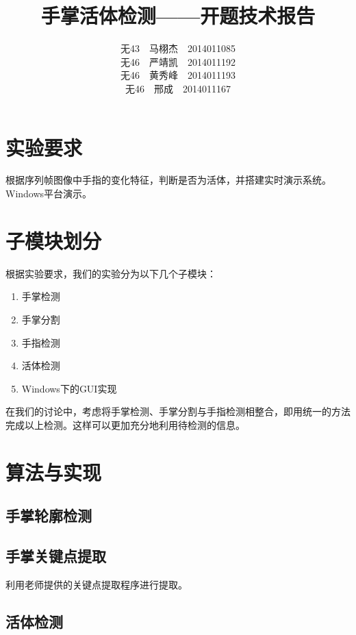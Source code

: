 \documentclass[UTF8]{ctexart}
\begin{document}
\title{手掌活体检测——开题技术报告}
\author{无43\ \ 马栩杰\ \ 2014011085\\ 无46\ \ 严靖凯\ \ 2014011192\\ 无46\ \ 黄秀峰\ \ 2014011193\\ 无46\ \ 邢成\ \ 2014011167}
\maketitle

\section{实验要求}

	根据序列帧图像中手指的变化特征，判断是否为活体，并搭建实时演示系统。Windows平台演示。

\section{子模块划分}

	根据实验要求，我们的实验分为以下几个子模块：

	\begin{enumerate}
		\item 手掌检测
		\item 手掌分割
		\item 手指检测
		\item 活体检测
		\item Windows下的GUI实现
	\end{enumerate}

	在我们的讨论中，考虑将手掌检测、手掌分割与手指检测相整合，即用统一的方法完成以上检测。这样可以更加充分地利用待检测的信息。

\section{算法与实现}

	\subsection{手掌轮廓检测}

	\subsection{手掌关键点提取}
	
		利用老师提供的关键点提取程序进行提取。

	\subsection{活体检测}
		
\end{document}
